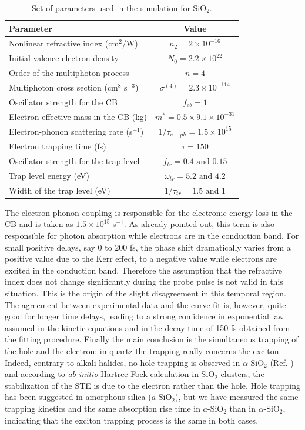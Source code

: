 \documentclass[aps,prb,reprint]{revtex4-2}
\begin{document}
\begin{table}[ht]
\centering
\begin{tabular}{lc}
\toprule
Parameter & Value \\
\midrule
Nonlinear refractive index (cm$^2$/W) & $n_2 = 2\times10^{-16}$ \\
Initial valence electron density & $N_0 = 2.2\times10^{22}$ \\
Order of the multiphoton process & $n = 4$ \\
Multiphoton cross section (cm$^8$ s$^{-3}$) & $\sigma^{(4)} = 2.3\times10^{-114}$ \\
Oscillator strength for the CB & $f_{cb} = 1$ \\
Electron effective mass in the CB (kg) & $m^* = 0.5 \times 9.1\times10^{-31}$ \\
Electron-phonon scattering rate (s$^{-1}$) & $1/\tau_{e-ph} = 1.5\times10^{15}$ \\
Electron trapping time (fs) & $\tau = 150$ \\
Oscillator strength for the trap level & $f_{tr} = 0.4 \text{ and } 0.15$ \\
Trap level energy (eV) & $\omega_{tr} = 5.2 \text{ and } 4.2$ \\
Width of the trap level (eV) & $1/\tau_{tr} = 1.5 \text{ and } 1$ \\
\bottomrule
\end{tabular}
\caption{Set of parameters used in the simulation for SiO$_2$.}
\label{tab:sio2_params}
\end{table}

The electron-phonon coupling is responsible for the electronic energy loss in the CB and is taken as $1.5\times10^{15}$ s$^{-1}$. As already pointed out, this term is also responsible for photon absorption while electrons are in the conduction band. For small positive delays, say 0 to 200 fs, the phase shift dramatically varies from a positive value due to the Kerr effect, to a negative value while electrons are excited in the conduction band. Therefore the assumption that the refractive index does not change significantly during the probe pulse is not valid in this situation. This is the origin of the slight disagreement in this temporal region. The agreement between experimental data and the curve fit is, however, quite good for longer time delays, leading to a strong confidence in exponential law assumed in the kinetic equations and in the decay time of 150 fs obtained from the fitting procedure. Finally the main conclusion is the simultaneous trapping of the hole and the electron: in quartz the trapping really concerns the exciton. Indeed, contrary to alkali halides, no hole trapping is observed in $\alpha$-SiO$_2$ (Ref. \cite{27}) and according to \textit{ab initio} Hartree-Fock calculation in SiO$_2$ clusters, the stabilization of the STE is due to the electron rather than the hole.\cite{28} Hole trapping has been suggested in amorphous silica ($a$-SiO$_2$),\cite{29} but we have measured the same trapping kinetics\cite{5} and the same absorption rise time\cite{4} in $a$-SiO$_2$ than in $\alpha$-SiO$_2$, indicating that the exciton trapping process is the same in both cases.
\end{document}
